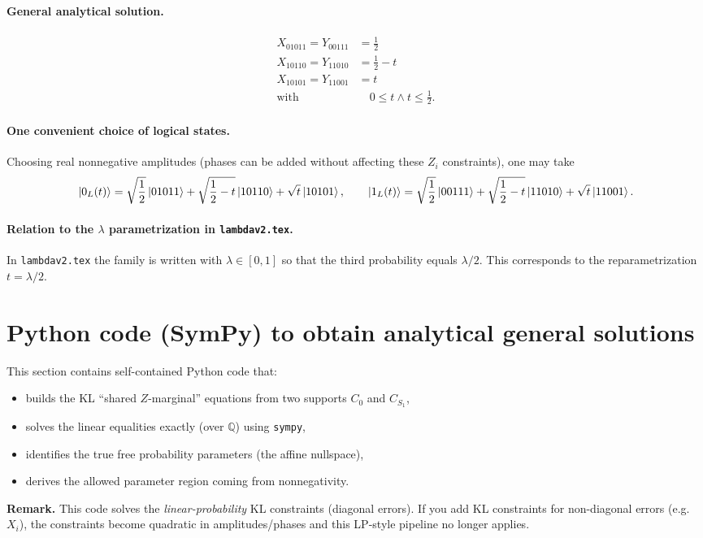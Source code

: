 \documentclass[11pt]{article}
\begin{document}
\paragraph{General analytical solution.}
\[
\begin{aligned}
X_{01011} = Y_{00111} &= \frac{1}{2}\\
X_{10110} = Y_{11010} &= \frac{1}{2} - t\\
X_{10101} = Y_{11001} &= t\\
\text{with }&\quad 0 \leq t \wedge t \leq \frac{1}{2}.
\end{aligned}
\]
\paragraph{One convenient choice of logical states.}
Choosing real nonnegative amplitudes (phases can be added without affecting these $Z_i$ constraints), one may take
\[
\ket{0_L(t)} = \sqrt{\frac{1}{2}}\ket{01011} + \sqrt{\frac{1}{2} - t}\ket{10110} + \sqrt{t}\ket{10101},\qquad \ket{1_L(t)} = \sqrt{\frac{1}{2}}\ket{00111} + \sqrt{\frac{1}{2} - t}\ket{11010} + \sqrt{t}\ket{11001}.
\]
\paragraph{Relation to the $\lambda$ parametrization in \texttt{lambdav2.tex}.}
In \texttt{lambdav2.tex} the family is written with $\lambda\in[0,1]$ so that the third probability equals $\lambda/2$. This corresponds to the reparametrization $t=\lambda/2$.


\section{Python code (SymPy) to obtain analytical general solutions}

This section contains self-contained Python code that:
\begin{itemize}
  \item builds the KL ``shared $Z$-marginal'' equations from two supports $C_0$ and $C_{S_1}$,
  \item solves the linear equalities exactly (over $\mathbb{Q}$) using \texttt{sympy},
  \item identifies the true free probability parameters (the affine nullspace),
  \item derives the allowed parameter region coming from nonnegativity.
\end{itemize}

\noindent
\textbf{Remark.} This code solves the \emph{linear-probability} KL constraints (diagonal errors).
If you add KL constraints for non-diagonal errors (e.g.\ $X_i$), the constraints become quadratic in amplitudes/phases and this LP-style pipeline no longer applies.
\end{document}
